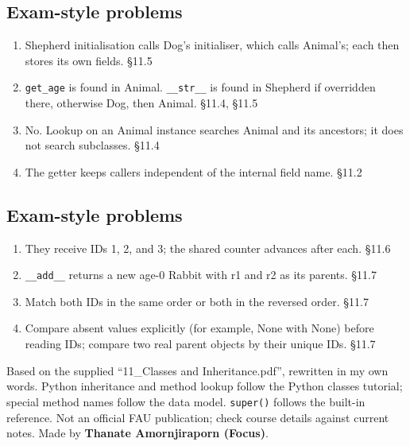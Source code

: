 \documentclass[11pt]{article}
\begin{document}
\begin{keepsection}\subsection{Exam-style problems}

\begin{enumerate}
\item Shepherd initialisation calls Dog’s initialiser, which calls Animal’s; each then stores its own fields. \hfill{\small\color{FAUblue}§11.5}
\item \texttt{get\_age} is found in Animal. \texttt{\_\_str\_\_} is found in Shepherd if overridden there, otherwise Dog, then Animal. \hfill{\small\color{FAUblue}§11.4, §11.5}
\item No. Lookup on an Animal instance searches Animal and its ancestors; it does not search subclasses. \hfill{\small\color{FAUblue}§11.4}
\item The getter keeps callers independent of the internal field name. \hfill{\small\color{FAUblue}§11.2}
\end{enumerate}

\end{keepsection}
\begin{keepsection}\subsection{Exam-style problems}

\begin{enumerate}
\item They receive IDs 1, 2, and 3; the shared counter advances after each. \hfill{\small\color{FAUblue}§11.6}
\item \texttt{\_\_add\_\_} returns a new age-0 Rabbit with r1 and r2 as its parents. \hfill{\small\color{FAUblue}§11.7}
\item Match both IDs in the same order or both in the reversed order. \hfill{\small\color{FAUblue}§11.7}
\item Compare absent values explicitly (for example, None with None) before reading IDs; compare two real parent objects by their unique IDs. \hfill{\small\color{FAUblue}§11.7}
\end{enumerate}

\end{keepsection}

\vfill{\small Based on the supplied “11\_Classes and Inheritance.pdf”, rewritten in my own words. Python inheritance and method lookup follow the Python classes tutorial; special method names follow the data model. \texttt{super()} follows the built-in reference. Not an official FAU publication; check course details against current notes. Made by \textbf{Thanate Amornjiraporn (Focus)}.}
\end{document}

